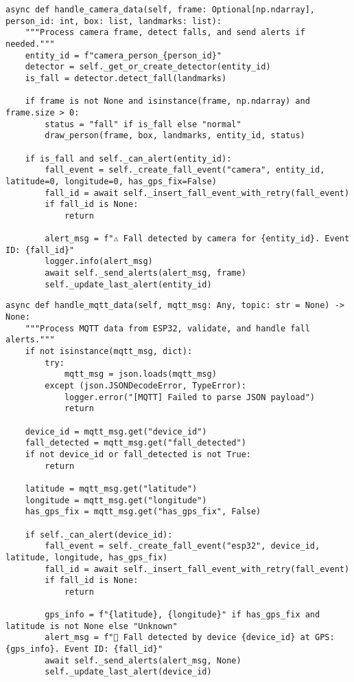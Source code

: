 \begin{verbatim}
async def handle_camera_data(self, frame: Optional[np.ndarray], person_id: int, box: list, landmarks: list):
    """Process camera frame, detect falls, and send alerts if needed."""
    entity_id = f"camera_person_{person_id}"
    detector = self._get_or_create_detector(entity_id)
    is_fall = detector.detect_fall(landmarks)

    if frame is not None and isinstance(frame, np.ndarray) and frame.size > 0:
        status = "fall" if is_fall else "normal"
        draw_person(frame, box, landmarks, entity_id, status)

    if is_fall and self._can_alert(entity_id):
        fall_event = self._create_fall_event("camera", entity_id, latitude=0, longitude=0, has_gps_fix=False)
        fall_id = await self._insert_fall_event_with_retry(fall_event)
        if fall_id is None:
            return

        alert_msg = f"⚠️ Fall detected by camera for {entity_id}. Event ID: {fall_id}"
        logger.info(alert_msg)
        await self._send_alerts(alert_msg, frame)
        self._update_last_alert(entity_id)
\end{verbatim}

\begin{verbatim}
async def handle_mqtt_data(self, mqtt_msg: Any, topic: str = None) -> None:
    """Process MQTT data from ESP32, validate, and handle fall alerts."""
    if not isinstance(mqtt_msg, dict):
        try:
            mqtt_msg = json.loads(mqtt_msg)
        except (json.JSONDecodeError, TypeError):
            logger.error("[MQTT] Failed to parse JSON payload")
            return

    device_id = mqtt_msg.get("device_id")
    fall_detected = mqtt_msg.get("fall_detected")
    if not device_id or fall_detected is not True:
        return

    latitude = mqtt_msg.get("latitude")
    longitude = mqtt_msg.get("longitude")
    has_gps_fix = mqtt_msg.get("has_gps_fix", False)

    if self._can_alert(device_id):
        fall_event = self._create_fall_event("esp32", device_id, latitude, longitude, has_gps_fix)
        fall_id = await self._insert_fall_event_with_retry(fall_event)
        if fall_id is None:
            return

        gps_info = f"{latitude}, {longitude}" if has_gps_fix and latitude is not None else "Unknown"
        alert_msg = f"🚨 Fall detected by device {device_id} at GPS: {gps_info}. Event ID: {fall_id}"
        await self._send_alerts(alert_msg, None)
        self._update_last_alert(device_id)
\end{verbatim}

